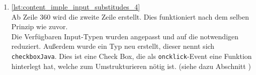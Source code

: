 \begin{enumerate}
	
	
	\item \autoref{lst:content_imple_input_substitudes_4}\\
	Ab Zeile 360 wird die zweite Zeile erstellt. Dies funktioniert nach dem selben Prinzip wie zuvor.\\
	Die Verfügbaren Input-Typen wurden angepasst und auf die notwendigen reduziert. Außerdem wurde ein Typ neu erstellt, dieser nennt sich \texttt{checkboxJava}. Dies ist eine Check Box, die als \texttt{oncklick}-Event eine Funktion hinterlegt hat, welche zum Umstrukturieren nötig ist. (siehe dazu Abschnitt )	
	
	
\end{enumerate}

